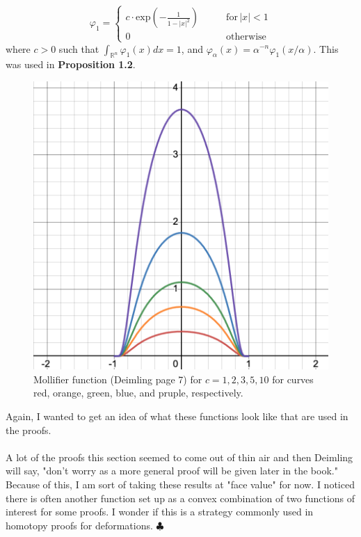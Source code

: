 \documentclass[reqno, 12pt]{article}
\newcommand{\R}{\mathbb{R}}
\newcommand{\END}{\hspace*{\fill} $\clubsuit$}
\begin{document}
$$\varphi_1 = \begin{cases}
	c\cdot \text{exp}\left(-\frac{1}{1- |x|^2}\right) \qquad &\text{for} \, |x| < 1 \\
	0 \qquad &\text{otherwise}
\end{cases}$$
where $c > 0$ such that $\int_{\R^n}\varphi_1(x) dx = 1$, and $\varphi_\alpha(x) = \alpha^{-n}\varphi_1(x/\alpha)$. This was used in \textbf{Proposition 1.2}.
\begin{figure}
\centering
\includegraphics[width = .5\textwidth]{mollifier.png}
\caption{Mollifier function (Deimling page 7) for $c = 1,2,3,5,10$ for curves red, orange, green, blue, and pruple, respectively.}
\end{figure}
Again, I wanted to get an idea of what these functions look like that are used in the proofs. 
\\\\A lot of the proofs this section seemed to come out of thin air and then Deimling will say, "don't worry as a more general proof will be given later in the book." Because of this, I am sort of taking these results at "face value" for now. I noticed there is often another function set up as a convex combination of two functions of interest for some proofs. I wonder if this is a strategy commonly used in homotopy proofs for deformations. \END
\end{document}
